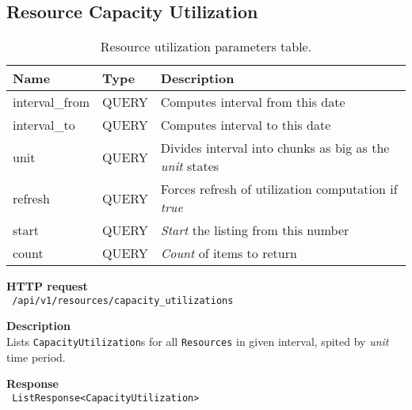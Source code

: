 \subsection{Resource Capacity Utilization}
\begin{table}[ht!]
    \begin{tabularx}{\textwidth}{llX}
        \toprule
        Name & Type & Description \\
        \midrule
        interval\_from & QUERY & Computes interval from this date \\  
        interval\_to & QUERY & Computes interval to this date \\
        unit & QUERY & Divides interval into chunks as big as the \emph{unit} states \\
        refresh & QUERY & Forces refresh of utilization computation if \emph{true} \\
        start & QUERY & \emph{Start} the listing from this number \\  
        count & QUERY & \emph{Count} of items to return
        \end{tabularx}
    \caption{Resource utilization parameters table.}
\end{table}
\begin{description}
    \item \textbf{HTTP request}\\
        \texttt{\text{[GET]} /api/v1/resources/capacity\_utilizations}
    \item \textbf{Description}\\
        Lists \texttt{CapacityUtilization}s for all \texttt{Resources} in given interval, spited by \emph{unit} time period.
    \item \textbf{Response}\\
        \texttt{\text{[200 OK]} ListResponse<CapacityUtilization>}
\end{description}